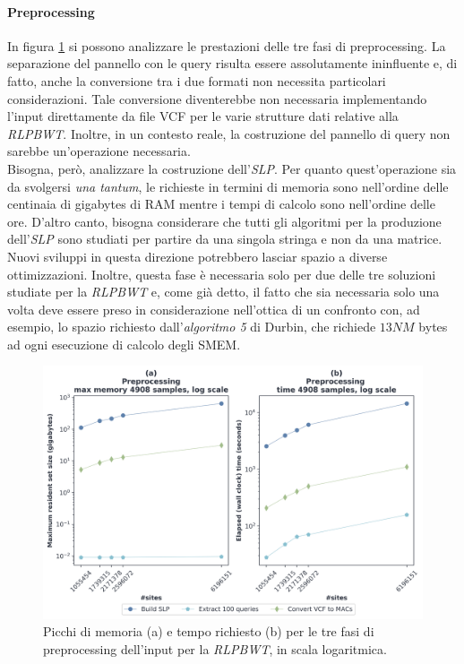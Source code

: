 \paragraph{Preprocessing}
In figura \ref{fig:prechr} si possono analizzare le prestazioni delle tre
fasi di preprocessing. La separazione del pannello con le query risulta essere
assolutamente 
ininfluente e, di fatto, anche la conversione tra i due formati non
necessita particolari considerazioni. Tale conversione 
diventerebbe non necessaria implementando l'input direttamente da file VCF per
le varie strutture dati relative alla \textit{RLPBWT}. Inoltre, in un contesto
reale, la costruzione del pannello di query non sarebbe un'operazione
necessaria.\\
Bisogna, però, analizzare la costruzione 
dell'\textit{SLP}. Per quanto quest'operazione sia da svolgersi \textit{una
  tantum}, le richieste in termini di memoria sono nell'ordine delle centinaia
di gigabytes di RAM mentre i tempi di calcolo sono nell'ordine delle
ore. D'altro canto, bisogna considerare che tutti gli algoritmi per la produzione
dell'\textit{SLP} sono studiati per partire da una singola stringa e non da una
matrice. Nuovi sviluppi in questa direzione potrebbero lasciar spazio a diverse
ottimizzazioni. Inoltre,
questa fase è necessaria solo per due delle tre soluzioni studiate per la
\textit{RLPBWT} e, come già detto, il fatto che sia necessaria solo una volta
deve essere preso in considerazione nell'ottica di un confronto con, ad esempio,
lo spazio richiesto dall'\textit{algoritmo 5} di Durbin, che richiede $13NM$
bytes ad ogni esecuzione di calcolo degli SMEM.
\begin{figure}
  \centering
  \includegraphics[width=\linewidth]{img/prep_mem_time.png}
  \caption{Picchi di memoria (a) e tempo richiesto (b) per le tre fasi di
    preprocessing dell'input per la \textit{RLPBWT}, in scala logaritmica.}
  \label{fig:prechr}
\end{figure}
